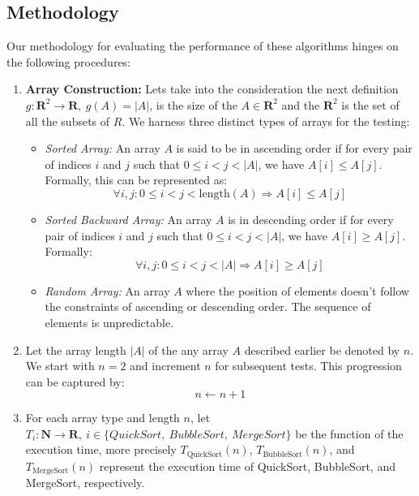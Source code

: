 \subsection{Methodology}
Our methodology for evaluating the performance of these algorithms hinges on the following procedures:
\begin{enumerate}
    \item \textbf{Array Construction:} Lets take into the consideration the next definition $g: \mathbf{R}^2 \rightarrow \mathbf{R},\  g(A) = |A|$, is the size of the $A \in \mathbf{R}^2$ and the $\mathbf{R}^2$ is the set of all the subsets of $R$. We harness three distinct types of arrays for the testing:
    \begin{itemize}
        \item \textit{Sorted Array:} An array \( A \) is said to be in ascending order if for every pair of indices \( i \) and \( j \) such that \( 0 \leq i < j < |A| \), we have \( A[i] \leq A[j] \). Formally, this can be represented as:
        \[ \forall i, j : 0 \leq i < j < \text{length}(A) \Rightarrow A[i] \leq A[j] \]
        
        \item \textit{Sorted Backward Array:} An array \( A \) is in descending order if for every pair of indices \( i \) and \( j \) such that \( 0 \leq i < j < |A| \), we have \( A[i] \geq A[j] \). Formally:
        \[ \forall i, j : 0 \leq i < j < |A| \Rightarrow A[i] \geq A[j] \]
        
        \item \textit{Random Array:} An array \( A \) where the position of elements doesn't follow the constraints of ascending or descending order. The sequence of elements is unpredictable.
    \end{itemize}
    
    \item Let the array length $|A|$ of the any array $A$ described earlier be denoted by \( n \). We start with \( n = 2 \) and increment \( n \) for subsequent tests. This progression can be captured by:
\[ n \leftarrow n + 1 \]

\item For each array type and length \( n \), let $T_i: \mathbf{N} \rightarrow \mathbf{R}, \ i \in \{QuickSort,\  BubbleSort,\  MergeSort\}$ be the function of the execution time, more precisely  \( T_{\text{QuickSort}}(n) \), \( T_{\text{BubbleSort}}(n) \), and \( T_{\text{MergeSort}}(n) \) represent the execution time of QuickSort, BubbleSort, and MergeSort, respectively.


\end{enumerate}
